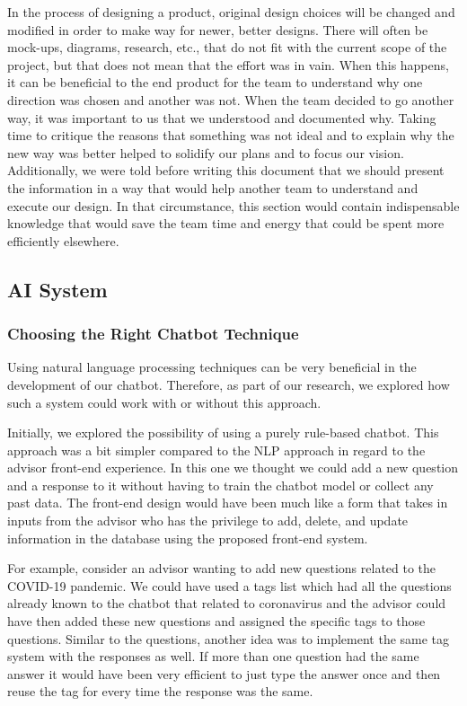\documentclass[titlepage, 12pt]{article}
\begin{document}
In the process of designing a product, original design choices will be changed and modified in order to make way for newer, better designs. There will often be mock-ups, diagrams, research, etc., that do not fit with the current scope of the project, but that does not mean that the effort was in vain. When this happens, it can be beneficial to the end product for the team to understand why one direction was chosen and another was not. When the team decided to go another way, it was important to us that we understood and documented why. Taking time to critique the reasons that something was not ideal and to explain why the new way was better helped to solidify our plans and to focus our vision. Additionally, we were told before writing this document that we should present the information in a way that would help another team to understand and execute our design. In that circumstance, this section would contain indispensable knowledge that would save the team time and energy that could be spent more efficiently elsewhere.

\subsection{AI System}

\subsubsection{Choosing the Right Chatbot Technique}

Using natural language processing techniques can be very beneficial in the development of our chatbot. Therefore, as part of our research, we explored how such a system could work with or without this approach.

Initially, we explored the possibility of using a purely rule-based chatbot. This approach was a bit simpler compared to the NLP approach in regard to the advisor front-end experience. In this one we thought we could add a new question and a response to it without having to train the chatbot model or collect any past data. The front-end design would have been much like a form that takes in inputs from the advisor who has the privilege to add, delete, and update information in the database using the proposed front-end system.

For example, consider an advisor wanting to add new questions related to the COVID-19 pandemic. We could have used a tags list which had all the questions already known to the chatbot that related to coronavirus and the advisor could have then added these new questions and assigned the specific tags to those questions. Similar to the questions, another idea was to implement the same tag system with the responses as well. If more than one question had the same answer it would have been very efficient to just type the answer once and then reuse the tag for every time the response was the same.
\end{document}
